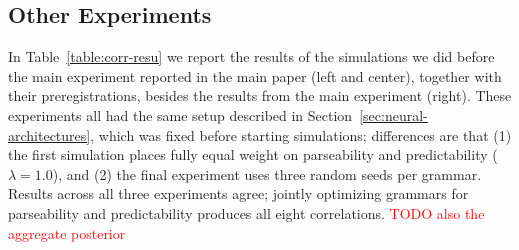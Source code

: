 \documentclass[10pt,twoside,lineno]{article}
\begin{document}
\subsection{Other Experiments}
In Table~\ref{table:corr-resu} we report the results of the simulations we did before the main experiment reported in the main paper (left and center), together with their preregistrations, besides the results from the main experiment (right).
These experiments all had the same setup described in Section~\ref{sec:neural-architectures}, which was fixed before starting simulations; differences are that (1) the first simulation places fully equal weight on parseability and predictability ($\lambda=1.0$), and (2) the final experiment uses three random seeds per grammar.
Results across all three experiments agree; jointly optimizing grammars for parseability and predictability produces all eight correlations.
\textcolor{red}{TODO also the aggregate posterior}
\end{document}
